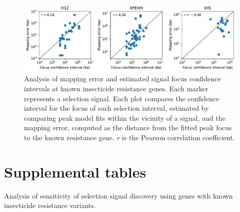 \begin{refsection}
\clearpage
\begin{figure}[h!]
\centering
\includegraphics[width=1.1\textwidth,center]{artwork/chapter5/accuracy.pdf}
\caption{Analysis of mapping error and estimated signal focus confidence intervals at known insecticide resistance genes.
%
Each marker represents a selection signal.
%
Each plot compares the confidence interval for the focus of each selection interval, estimated by comparing peak model fits within the vicinity of a signal, and the mapping error, computed as the distance from the fitted peak focus to the known resistance gene.
%
\textit{r} is the Pearson correlation coefficient.
}
\label{fig:accuracy}
\end{figure}


\clearpage
\section{Supplemental tables}\label{sec:ch5-supplemental-tables}


\begin{table}[h]
\begin{center}
\begin{threeparttable}
%
\caption{Analysis of sensitivity of selection signal discovery using genes with known insecticide resistance variants.}
%
\label{table:sens}
%

%
\end{threeparttable}
\end{center}
\end{table}


\clearpage
\begin{table}[h]
\begin{center}
\begin{threeparttable}


\end{threeparttable}
\end{center}
\end{table}
\end{refsection}

